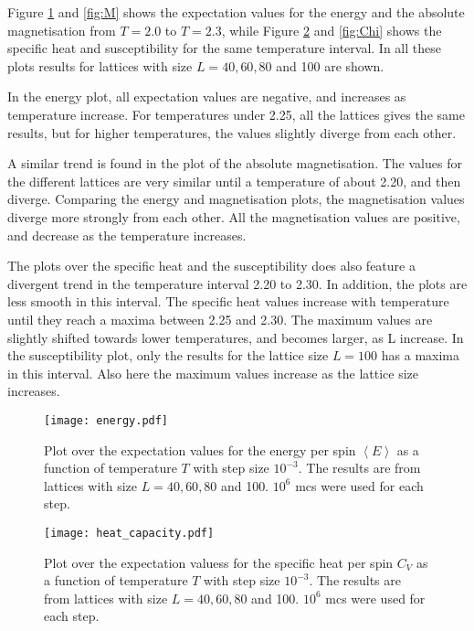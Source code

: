 Figure \ref{fig:E} and \ref{fig:M} shows the expectation values for the energy and the absolute magnetisation from $T=2.0$ to $T=2.3$, while Figure \ref{fig:C} and \ref{fig:Chi} shows the specific heat and susceptibility for the same temperature interval. In all these plots results for lattices with size $L=40,60,80$ and 100 are shown. 

In the energy plot, all expectation values are negative, and increases as temperature increase. For temperatures under 2.25, all the lattices gives the same results, but for higher temperatures, the values slightly diverge from each other.
 
A similar trend is found in the plot of the absolute magnetisation. The values for the different lattices are very similar until a temperature of about 2.20, and then diverge. Comparing the energy and magnetisation plots, the magnetisation values diverge more strongly from each other. All the magnetisation values are positive, and decrease as the temperature increases.   

The plots over the specific heat and the susceptibility does also feature a divergent trend in the temperature interval 2.20 to 2.30. In addition, the plots are less smooth in this interval. The specific heat values increase with temperature until they reach a maxima between 2.25 and 2.30. The maximum values are slightly shifted towards lower temperatures, and becomes larger, as L increase. In the susceptibility plot, only the results for the lattice size $L=100$ has a maxima in this interval. Also here the maximum values increase as the lattice size increases.   
\begin{figure}[htbp]
	\centering
	\texttt{[image: energy.pdf]}
	\caption{Plot over the expectation values for the energy per spin $\left\langle E\right\rangle$ as a function of temperature $T$ with step size $10^{-3}$. The results are from lattices with size $L=40,60,80$ and 100.  $10^6$ mcs were used for each step.}
	\label{fig:E}
\end{figure}

\begin{figure}[htbp]
	\centering
	\texttt{[image: heat\_capacity.pdf]}
	\caption{Plot over the expectation valuess for the specific heat per spin $C_V$ as a function of temperature $T$ with step size $10^{-3}$. The results are from lattices with size $L=40,60,80$ and 100. $10^6$ mcs were used for each step.}
	\label{fig:C}
\end{figure}

